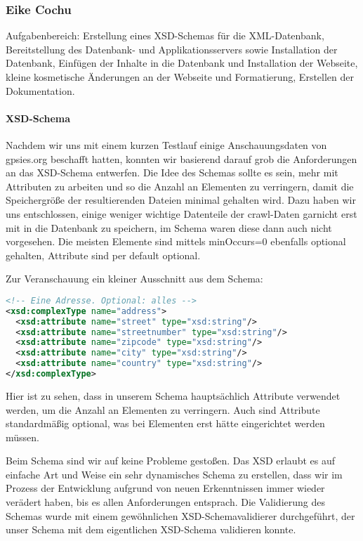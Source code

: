 \subsubsection{Eike Cochu}
Aufgabenbereich: Erstellung eines XSD-Schemas für die XML-Datenbank, Bereitstellung des Datenbank- und Applikationsservers sowie Installation der Datenbank, Einfügen der Inhalte in die Datenbank und Installation der Webseite, kleine kosmetische Änderungen an der Webseite und Formatierung, Erstellen der Dokumentation.

\paragraph{XSD-Schema}
Nachdem wir uns mit einem kurzen Testlauf einige Anschauungsdaten von gpsies.org beschafft hatten, konnten wir basierend darauf grob die Anforderungen an das XSD-Schema entwerfen. Die Idee des Schemas sollte es sein, mehr mit Attributen zu arbeiten und so die Anzahl an Elementen zu verringern, damit die Speichergröße der resultierenden Dateien minimal gehalten wird. Dazu haben wir uns entschlossen, einige weniger wichtige Datenteile der crawl-Daten garnicht erst mit in die Datenbank zu speichern, im Schema waren diese dann auch nicht vorgesehen. Die meisten Elemente sind mittels minOccurs=0 ebenfalls optional gehalten, Attribute sind per default optional.

Zur Veranschauung ein kleiner Ausschnitt aus dem Schema:

\begin{lstlisting}[language=XML]
<!-- Eine Adresse. Optional: alles -->
<xsd:complexType name="address">
  <xsd:attribute name="street" type="xsd:string"/>
  <xsd:attribute name="streetnumber" type="xsd:string"/>
  <xsd:attribute name="zipcode" type="xsd:string"/>
  <xsd:attribute name="city" type="xsd:string"/>
  <xsd:attribute name="country" type="xsd:string"/>
</xsd:complexType>
\end{lstlisting}

Hier ist zu sehen, dass in unserem Schema hauptsächlich Attribute verwendet werden, um die Anzahl an Elementen zu verringern. Auch sind Attribute standardmäßig optional, was bei Elementen erst hätte eingerichtet werden müssen.

Beim Schema sind wir auf keine Probleme gestoßen. Das XSD erlaubt es auf einfache Art und Weise ein sehr dynamisches Schema zu erstellen, dass wir im Prozess der Entwicklung aufgrund von neuen Erkenntnissen immer wieder verädert haben, bis es allen Anforderungen entsprach. Die Validierung des Schemas wurde mit einem gewöhnlichen XSD-Schemavalidierer durchgeführt, der unser Schema mit dem eigentlichen XSD-Schema validieren konnte.

